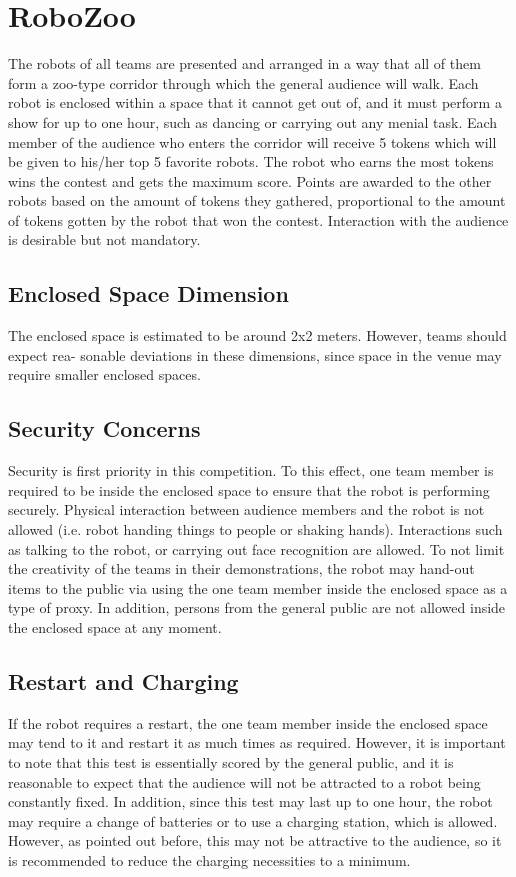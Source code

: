 \section{RoboZoo}
The robots of all teams are presented and arranged in a way that all of them form a zoo-type
corridor through which the general audience will walk. Each robot is enclosed within a space
that it cannot get out of, and it must perform a show for up to one hour, such as dancing or
carrying out any menial task.
Each member of the audience who enters the corridor will receive 5 tokens which will be given
to his/her top 5 favorite robots. The robot who earns the most tokens wins the contest and gets
the maximum score. Points are awarded to the other robots based on the amount of tokens they
gathered, proportional to the amount of tokens gotten by the robot that won the contest.
Interaction with the audience is desirable but not mandatory.

\subsection{Enclosed Space Dimension}
The enclosed space is estimated to be around 2x2 meters. However, teams should expect rea-
sonable deviations in these dimensions, since space in the venue may require smaller enclosed
spaces.

\subsection{Security Concerns}
Security is first priority in this competition. To this effect, one team member is required to be
inside the enclosed space to ensure that the robot is performing securely.
Physical interaction between audience members and the robot is not allowed (i.e. robot
handing things to people or shaking hands). Interactions such as talking to the robot, or
carrying out face recognition are allowed. To not limit the creativity of the teams in their
demonstrations, the robot may hand-out items to the public via using the one team member
inside the enclosed space as a type of proxy.
In addition, persons from the general public are not allowed inside the enclosed space at any
moment.

\subsection{Restart and Charging}
If the robot requires a restart, the one team member inside the enclosed space may tend to
it and restart it as much times as required. However, it is important to note that this test is
essentially scored by the general public, and it is reasonable to expect that the audience will not
be attracted to a robot being constantly fixed.
In addition, since this test may last up to one hour, the robot may require a change of batteries
or to use a charging station, which is allowed. However, as pointed out before, this may not be
attractive to the audience, so it is recommended to reduce the charging necessities to a minimum.

